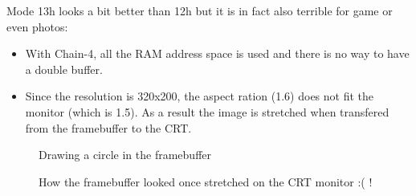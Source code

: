 \documentclass[book.tex]{subfiles}
\begin{document}
  \begin{minipage}{\textwidth}
  
  \end{minipage}
  
  Mode 13h looks a bit better than 12h but it is in fact also terrible for game or even photos:\\
  \begin{itemize}
\item With Chain-4, all the RAM address space is used and there is no way to have a double buffer.
\item Since the resolution is 320x200, the aspect ration (1.6) does not fit the monitor (which is 1.5). As a result the image is stretched when transfered from the 
framebuffer to the CRT.
\end{itemize}

\begin{figure}[H]
  \centering
  \caption{Drawing a circle in the framebuffer}
\end{figure}

\begin{figure}[H]
  \centering
  \caption{How the framebuffer looked once stretched on the CRT monitor :( !}
\end{figure}
\par
\end{document}

